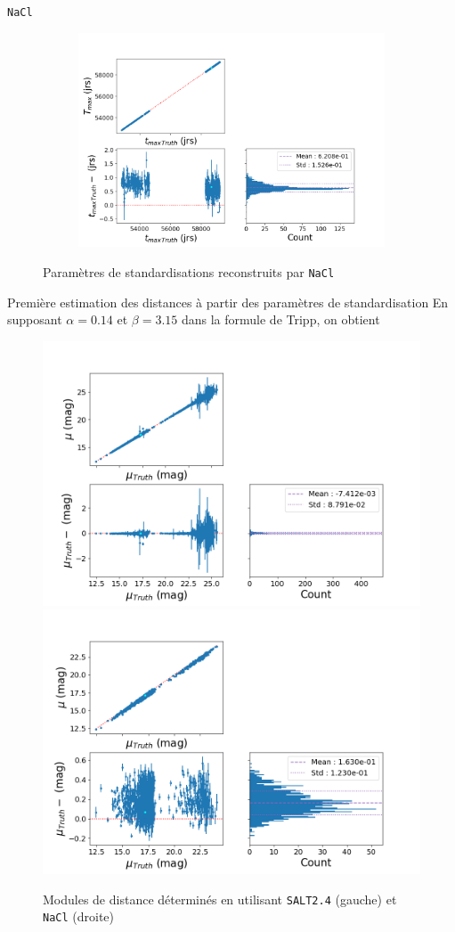 \documentclass{beamer}
\begin{document}
\begin{frame}{\texttt{NaCl}}
\begin{figure}
\begin{subfigure}{0.49\textwidth}
		\includegraphics[width=.8\textwidth]{figures/nacl_tmax.png}
	\end{subfigure}
	\caption{Paramètres de standardisations reconstruits par \texttt{NaCl}}
\end{figure}
\end{frame}

\begin{frame}{Première estimation des distances à partir des paramètres de standardisation}
En supposant $\alpha=0.14$ et $\beta=3.15$ dans la formule de Tripp, on obtient
\begin{figure}
	\centering
	\includegraphics[width=.48\textwidth]{figures/salt_mu.png}
	\includegraphics[width=.48\textwidth]{figures/nacl_mu.png}
	\caption{Modules de distance déterminés en utilisant \texttt{SALT2.4} (gauche) et \texttt{NaCl} (droite)}
\end{figure}
\end{frame}
\end{document}
